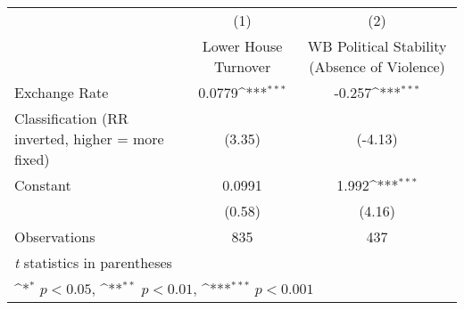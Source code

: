{
\def\sym#1{\ifmmode^{#1}\else\(^{#1}\)\fi}
\begin{tabular}{l*{2}{c}}
\hline\hline
                    &\multicolumn{1}{c}{(1)}&\multicolumn{1}{c}{(2)}\\
                    &\multicolumn{1}{c}{Lower House Turnover}&\multicolumn{1}{c}{WB Political Stability (Absence of Violence)}\\
\hline
Exchange Rate       &      0.0779\sym{***}&      -0.257\sym{***}\\
Classification (RR inverted, higher = more fixed)&      (3.35)         &     (-4.13)         \\
[1em]
Constant            &      0.0991         &       1.992\sym{***}\\
                    &      (0.58)         &      (4.16)         \\
\hline
Observations        &         835         &         437         \\
\hline\hline
\multicolumn{3}{l}{\footnotesize \textit{t} statistics in parentheses}\\
\multicolumn{3}{l}{\footnotesize \sym{*} \(p<0.05\), \sym{**} \(p<0.01\), \sym{***} \(p<0.001\)}\\
\end{tabular}
}
